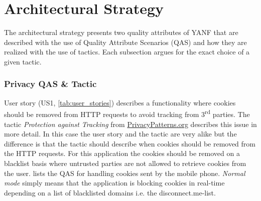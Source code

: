 \documentclass[main.tex]{subfiles}
\begin{document}
\section{Architectural Strategy}
The architectural strategy presents two quality attributes of YANF that are described with the use of Quality Attribute Scenarios (QAS) and how they are realized with the use of tactics. Each subsection argues for the exact choice of a given tactic.



\subsubsection{Privacy QAS \& Tactic}
\label{subsec:PrivacyTacticandScenario}
User story (US1, \autoref{tab:user_stories}) describes a functionality where cookies should be removed from HTTP requests to avoid tracking from 3\textsuperscript{rd} parties. The tactic \textit{Protection against Tracking} from \hyperlink{PrivacyPatterns.org}{PrivacyPatterns.org}\cite{UCBerkeley-SchoolofInformationProtectionPatterns} describes this issue in more detail. In this case the user story and the tactic are very alike but the difference is that the tactic should describe when cookies should be removed from the HTTP requests. For this application the cookies should be removed on a blacklist basis where untrusted parties are not allowed to retrieve cookies from the user.  lists the QAS for handling cookies sent by the mobile phone. \textit{Normal mode} simply means that the application is blocking cookies in real-time depending on a list of blacklisted domains i.e. the disconnect.me-list.
\end{document}
